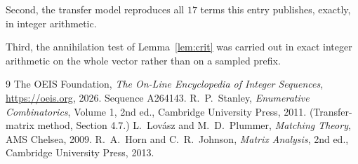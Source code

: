 \documentclass[11pt,a4paper]{article}
\theoremstyle{plain}
\theoremstyle{definition}
\begin{document}
Second, the transfer model reproduces all $17$ terms this entry publishes, exactly, in
integer arithmetic.

Third, the annihilation test of Lemma~\ref{lem:crit} was carried out in exact integer
arithmetic on the whole vector rather than on a sampled prefix.

\begin{thebibliography}{9}
 The OEIS Foundation, \emph{The On-Line Encyclopedia of Integer
Sequences}, \url{https://oeis.org}, 2026. Sequence A264143.
 R.~P.~Stanley, \emph{Enumerative Combinatorics}, Volume 1, 2nd ed.,
Cambridge University Press, 2011. (Transfer-matrix method, Section 4.7.)
 L.~Lov\'asz and M.~D.~Plummer, \emph{Matching Theory}, AMS Chelsea, 2009.
 R.~A.~Horn and C.~R.~Johnson, \emph{Matrix Analysis}, 2nd ed., Cambridge
University Press, 2013.
\end{thebibliography}
\end{document}
